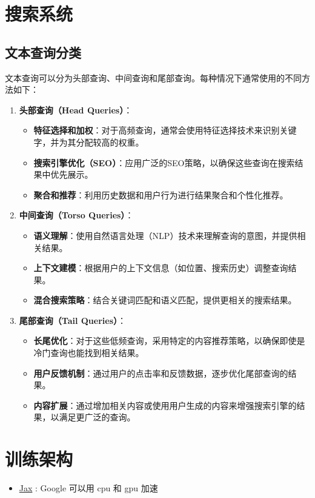 \documentclass[12pt]{article}
\numberwithin{theorem}{section} %
\numberwithin{definition}{section} %
\numberwithin{assumption}{section} %
\numberwithin{lemma}{section} %
\numberwithin{remark}{section} %
\numberwithin{prop}{section} %
\numberwithin{corollary}{section} %
\numberwithin{example}{section} %
\numberwithin{question}{section} %
\numberwithin{problem}{section} %
\numberwithin{conjecture}{section} %
\numberwithin{append}{section} %
\numberwithin{property}{section} %
\begin{document}
\begin{CJK}{UTF8}{gbsn}
\section{搜索系统}
\subsection{文本查询分类}

文本查询可以分为头部查询、中间查询和尾部查询。每种情况下通常使用的不同方法如下：

\begin{enumerate}
	\item \textbf{头部查询（Head Queries）}：
	\begin{itemize}
		\item \textbf{特征选择和加权}：对于高频查询，通常会使用特征选择技术来识别关键字，并为其分配较高的权重。
		\item \textbf{搜索引擎优化（SEO）}：应用广泛的SEO策略，以确保这些查询在搜索结果中优先展示。
		\item \textbf{聚合和推荐}：利用历史数据和用户行为进行结果聚合和个性化推荐。
	\end{itemize}
	
	\item \textbf{中间查询（Torso Queries）}：
	\begin{itemize}
		\item \textbf{语义理解}：使用自然语言处理（NLP）技术来理解查询的意图，并提供相关结果。
		\item \textbf{上下文建模}：根据用户的上下文信息（如位置、搜索历史）调整查询结果。
		\item \textbf{混合搜索策略}：结合关键词匹配和语义匹配，提供更相关的搜索结果。
	\end{itemize}
	
	\item \textbf{尾部查询（Tail Queries）}：
	\begin{itemize}
		\item \textbf{长尾优化}：对于这些低频查询，采用特定的内容推荐策略，以确保即使是冷门查询也能找到相关结果。
		\item \textbf{用户反馈机制}：通过用户的点击率和反馈数据，逐步优化尾部查询的结果。
		\item \textbf{内容扩展}：通过增加相关内容或使用用户生成的内容来增强搜索引擎的结果，以满足更广泛的查询。
	\end{itemize}
\end{enumerate}

	

\section{训练架构}
\begin{itemize}
	\item\href{https://www.bilibili.com/video/BV1pR4y1h7TR/?spm_id_from=333.337.search-card.all.click&vd_source=7a090a6e6fbf50b4a73122127ec9b13b}{Jax}	: Google 可以用 cpu 和 gpu 加速 
\end{itemize}


\end{CJK}
\end{document}
